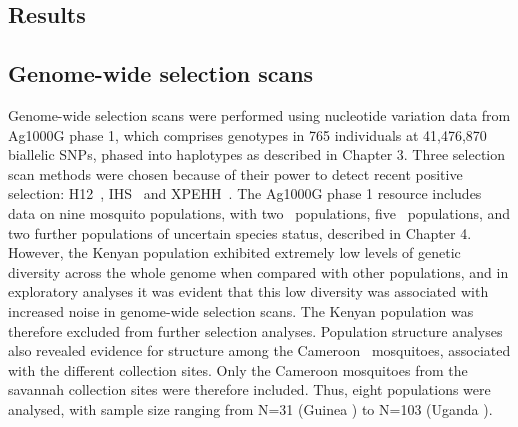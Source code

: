 \begin{refsection}
\section{Results}\label{sec:ch5-results}


\subsection{Genome-wide selection scans}\label{subsec:results-gwss}


Genome-wide selection scans were performed using nucleotide variation data from Ag1000G phase 1, which comprises genotypes in 765 individuals at 41,476,870 biallelic SNPs, phased into haplotypes as described in Chapter 3.
%
Three selection scan methods were chosen because of their power to detect recent positive selection: H12~\parencite{Garud2015}, IHS~\parencite{Voight2006} and XPEHH~\parencite{Sabeti2007}.
%
The Ag1000G phase 1 resource includes data on nine mosquito populations, with two \acol\ populations, five \agam\ populations, and two further populations of uncertain species status, described in Chapter 4.
%
However, the Kenyan population exhibited extremely low levels of genetic diversity across the whole genome when compared with other populations, and in exploratory analyses it was evident that this low diversity was associated with increased noise in genome-wide selection scans.
%
The Kenyan population was therefore excluded from further selection analyses.
%
Population structure analyses also revealed evidence for structure among the Cameroon \agam\ mosquitoes, associated with the different collection sites.
%
Only the Cameroon mosquitoes from the savannah collection sites were therefore included.
%
Thus, eight populations were analysed, with sample size ranging from N=31 (Guinea \agam) to N=103 (Uganda \agam).



\end{refsection}
